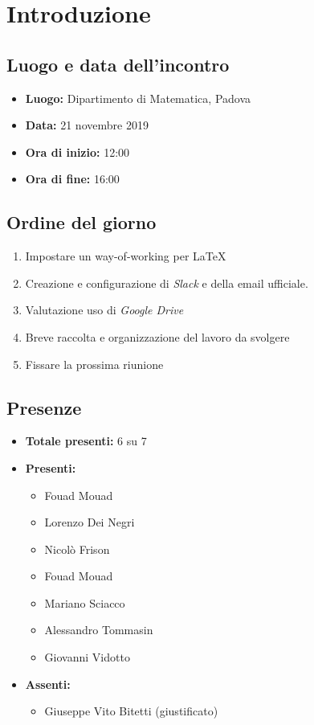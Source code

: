 \section*{Introduzione}

\subsection*{Luogo e data dell'incontro}
	\begin{itemize}
		\item \textbf{Luogo:} Dipartimento di Matematica, Padova
		\item \textbf{Data:} 21 novembre 2019
		\item \textbf{Ora di inizio:} 12:00
		\item \textbf{Ora di fine:} 16:00
	\end{itemize}

\subsection*{Ordine del giorno}
	\begin{enumerate}
		\item Impostare un way-of-working per \LaTeX{}
		\item Creazione e configurazione di \textit{Slack} e della email ufficiale. 
		\item Valutazione uso di \textit{Google Drive}
		\item Breve raccolta e organizzazione del lavoro da svolgere
		\item Fissare la prossima riunione
	\end{enumerate}

\subsection*{Presenze}
	\begin{itemize}
		\item \textbf{Totale presenti:} 6 su 7
		\item \textbf{Presenti: }
			\begin{itemize}			
				\item Fouad Mouad
				\item Lorenzo Dei Negri
				\item Nicolò Frison
				\item Fouad Mouad
				\item Mariano Sciacco
				\item Alessandro Tommasin
				\item Giovanni Vidotto
			\end{itemize}
		\item \textbf{Assenti: } 
			\begin{itemize}	
				\item Giuseppe Vito Bitetti (giustificato)
			\end{itemize}
	\end{itemize}


